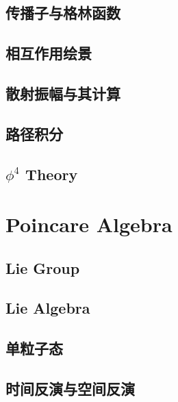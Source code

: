 \documentclass{article}
\begin{document}
\subsection{传播子与格林函数}



\subsection{相互作用绘景}







\subsection{散射振幅与其计算}


\subsection{路径积分}



\subsection{$\phi^4$ Theory}


\section{Poincare Algebra}


\subsection{Lie Group}



\subsection{Lie Algebra}



\subsection{单粒子态}




\subsection{时间反演与空间反演}
\end{document}

